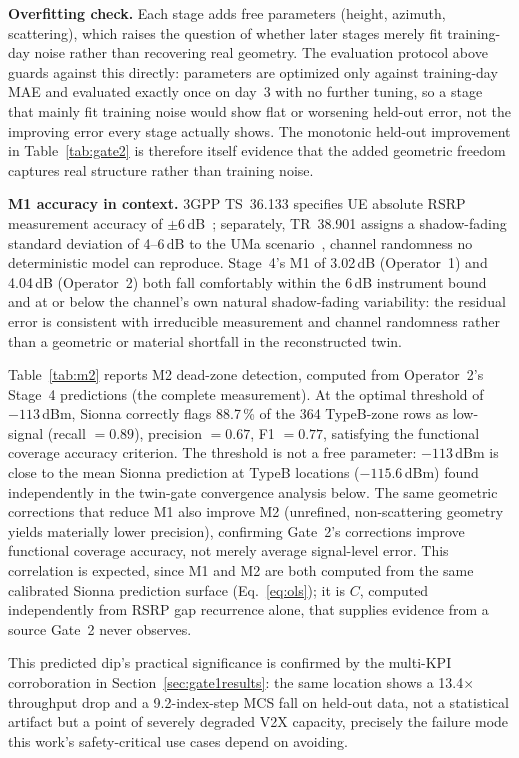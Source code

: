 \documentclass[conference]{IEEEtran}
\begin{document}
\textbf{Overfitting check.} Each stage adds free parameters (height,
azimuth, scattering), which raises the question of whether later stages
merely fit training-day noise rather than recovering real geometry.
The evaluation protocol above guards against this directly: parameters
are optimized only against training-day MAE and evaluated exactly once
on day~3 with no further tuning, so a stage that mainly fit training
noise would show flat or worsening held-out error, not the improving
error every stage actually shows. The monotonic held-out improvement in
Table~\ref{tab:gate2} is therefore itself evidence that the added
geometric freedom captures real structure rather than training noise.

\textbf{M1 accuracy in context.}
3GPP TS~36.133 specifies UE absolute RSRP measurement accuracy of
$\pm$6\,dB~\cite{3gpp36133}; separately, TR~38.901 assigns a
shadow-fading standard deviation of 4--6\,dB to the UMa
scenario~\cite{3gpp38901}, channel randomness no deterministic model
can reproduce. Stage~4's M1 of 3.02\,dB (Operator~1) and 4.04\,dB
(Operator~2) both fall comfortably within the 6\,dB instrument bound and
at or below the channel's own natural shadow-fading variability: the
residual error is consistent with irreducible measurement and channel
randomness rather than a geometric or material shortfall in the
reconstructed twin.

Table~\ref{tab:m2} reports M2 dead-zone detection, computed from
Operator~2's Stage~4 predictions (the complete measurement). At the
optimal threshold of $-113$\,dBm, Sionna correctly flags 88.7\,\% of
the 364 TypeB-zone rows as low-signal (recall $=0.89$), precision
$=0.67$, F1 $=0.77$, satisfying the functional coverage accuracy
criterion.
The threshold is not a free parameter: $-113$\,dBm is close to the mean
Sionna prediction at TypeB locations ($-115.6$\,dBm) found independently
in the twin-gate convergence analysis below. The same geometric
corrections that reduce M1 also improve M2 (unrefined, non-scattering
geometry yields materially lower precision), confirming Gate~2's
corrections improve functional coverage accuracy, not merely average
signal-level error. This correlation is expected, since M1 and M2 are
both computed from the same calibrated Sionna prediction surface
(Eq.~\eqref{eq:ols}); it is $C$, computed independently from RSRP gap
recurrence alone, that supplies evidence from a source Gate~2 never
observes.

This predicted dip's practical significance is confirmed by the
multi-KPI corroboration in Section~\ref{sec:gate1results}: the same
location shows a 13.4$\times$ throughput drop and a 9.2-index-step MCS
fall on held-out data, not a statistical artifact but a point of
severely degraded V2X capacity, precisely the failure mode this work's
safety-critical use cases depend on avoiding.
\end{document}
